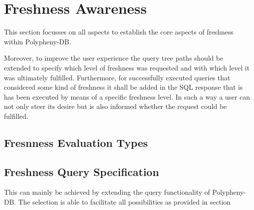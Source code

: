 






\section{Freshness Awareness}
This section focusses on all aspects to establish the core aspects of freshness within Polypheny-DB. 


Moreover, to improve the user experience the query tree paths should be extended to specify which level of freshness was requested and with which level it was 
ultimately fulfilled. Furthermore, for successfully executed queries that considered some kind of freshness it shall be added in the SQL response that is has been 
executed by means of a specific freshness level.
In such a way a user can not only steer its desire but is also informed whether the request could be fulfilled.

\subsection{Fresnness Evaluation Types}

\subsection{Freshness Query Specification}

This can mainly be achieved by extending the query functionality of Polypheny-DB.
The selection is able to facilitate all possibilities as provided in section 

